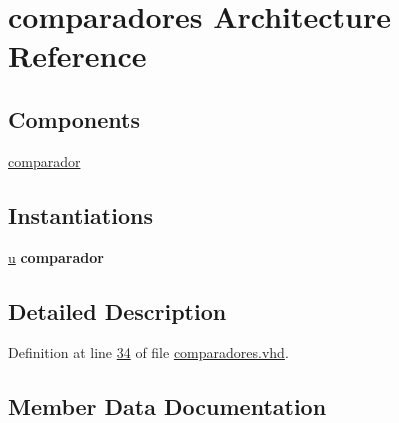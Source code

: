 \hypertarget{classcomparadores_1_1comparadores}{}\section{comparadores Architecture Reference}
\label{classcomparadores_1_1comparadores}
\subsection*{Components}
 \begin{DoxyCompactItemize}
\item 
\hyperlink{classcomparadores_1_1comparadores_ace6ea24c011c9df8c51cbea5a509a663}{comparador}  {\bfseries }  
\end{DoxyCompactItemize}
\subsection*{Instantiations}
 \begin{DoxyCompactItemize}
\item 
\hyperlink{classcomparadores_1_1comparadores_a6277e2a7446059985dc9bcf0a4ac1a8f}{u}  {\bfseries comparador}   
\end{DoxyCompactItemize}


\subsection{Detailed Description}


Definition at line \hyperlink{comparadores_8vhd_source_l00034}{34} of file \hyperlink{comparadores_8vhd_source}{comparadores.\+vhd}.



\subsection{Member Data Documentation}
\hypertarget{classcomparadores_1_1comparadores_ace6ea24c011c9df8c51cbea5a509a663}{}
\subsubsection[{comparador}]{ {\bfseries \textcolor{vhdlchar}{ }} \hspace{0.3cm}{\ttfamily [Component]}}\label{classcomparadores_1_1comparadores_ace6ea24c011c9df8c51cbea5a509a663}


